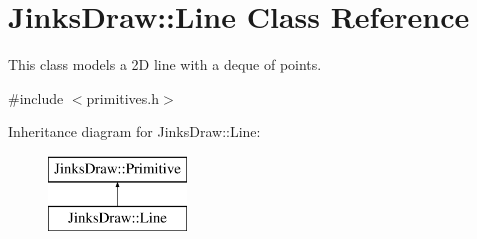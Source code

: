 \hypertarget{class_jinks_draw_1_1_line}{}\section{Jinks\+Draw\+:\+:Line Class Reference}
\label{class_jinks_draw_1_1_line}


This class models a 2D line with a deque of points.  




{\ttfamily \#include $<$primitives.\+h$>$}

Inheritance diagram for Jinks\+Draw\+:\+:Line\+:\begin{figure}[H]
\begin{center}
\leavevmode
\includegraphics[height=2.000000cm]{class_jinks_draw_1_1_line}
\end{center}
\end{figure}
